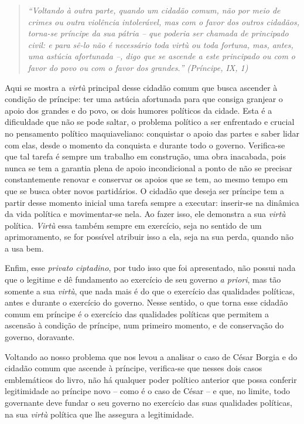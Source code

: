 \begin{quote}
\emph{``Voltando à outra parte, quando um cidadão comum, não por meio de
crimes ou outra violência intolerável, mas com o favor dos outros
cidadãos, torna-se príncipe da sua pátria -- que poderia ser chamada de
principado civil: e para sê-lo não é necessário toda virtù ou toda
fortuna, mas, antes, uma astúcia afortunada --, digo que se ascende a
este principado ou com o favor do povo ou com o favor dos
grandes}.\emph{'' (Príncipe, IX, 1)}
\end{quote}

Aqui se mostra a \emph{virtù} principal desse cidadão comum que busca
ascender à condição de príncipe: ter uma astúcia afortunada para que
consiga granjear o apoio dos grandes e do povo, os dois humores
políticos da cidade. Esta é a dificuldade que não se pode saltar, o
problema político a ser enfrentado e crucial no pensamento político
maquiaveliano: conquistar o apoio das partes e saber lidar com elas,
desde o momento da conquista e durante todo o governo. Verifica-se que
tal tarefa é sempre um trabalho em construção, uma obra inacabada, pois
nunca se tem a garantia plena de apoio incondicional a ponto de não se
precisar constantemente renovar e conservar os apoios que se tem, ao
mesmo tempo em que se busca obter novos partidários. O cidadão que
deseja ser príncipe tem a partir desse momento inicial uma tarefa sempre
a executar: inserir-se na dinâmica da vida política e movimentar-se
nela. Ao fazer isso, ele demonstra a sua \emph{virtù} política.
\emph{Virtù} essa também sempre em exercício, seja no sentido de um
aprimoramento, se for possível atribuir isso a ela, seja na sua perda,
quando não a usa bem.

Enfim, esse \emph{privato ciptadino}, por tudo isso que foi apresentado,
não possui nada que o legitime e dê fundamento ao exercício de seu
governo \emph{a priori}, mas tão somente a sua \emph{virtù}, que nada
mais é do que o exercício das qualidades políticas, antes e durante o
exercício do governo. Nesse sentido, o que torna esse cidadão comum em
príncipe é o exercício das qualidades políticas que permitem a ascensão
à condição de príncipe, num primeiro momento, e de conservação do
governo, doravante.

Voltando ao nosso problema que nos levou a analisar o caso de César
Borgia e do cidadão comum que ascende à príncipe, verifica-se que nesses
dois casos emblemáticos do livro, não há qualquer poder político
anterior que possa conferir legitimidade ao príncipe novo -- como é o
caso de César -- e que, no limite, todo governante deve fundar o seu
governo no exercício das suas qualidades políticas, na sua \emph{virtù}
política que lhe assegura a legitimidade.

